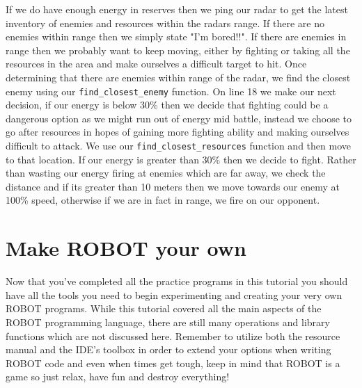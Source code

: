 \documentclass[a4paper]{article}
\begin{document}
If we do have enough energy in reserves then we ping our radar to get the latest inventory of enemies and resources within the radars range. If there are no enemies within range then we simply state "I'm bored!!". If there are enemies in range then we probably want to keep moving, either by fighting or taking all the resources in the area and make ourselves a difficult target to hit. Once determining that there are enemies within range of the radar, we find the closest enemy using our \texttt{find\_closest\_enemy} function. On line 18 we make our next decision, if our energy is below 30\% then we decide that fighting could be a dangerous option as we might run out of energy mid battle, instead we choose to go after resources in hopes of gaining more fighting ability and making ourselves difficult to attack. We use our \texttt{find\_closest\_resources} function and then move to that location. If our energy is greater than 30\% then we decide to fight. Rather than wasting our energy firing at enemies which are far away, we check the distance and if its greater than 10 meters then we move towards our enemy at 100\% speed, otherwise if we are in fact in range, we fire on our opponent.\\
 
\section*{Make ROBOT your own}

Now that you've completed all the practice programs in this tutorial you should have all the tools you need to begin experimenting and creating your very own ROBOT programs. While this tutorial covered all the main aspects of the ROBOT programming language, there are still many operations and library functions which are not discussed here. Remember to utilize both the resource manual and the IDE's toolbox in order to extend your options when writing ROBOT code and even when times get tough, keep in mind that ROBOT is a game so just relax, have fun and destroy everything!
\end{document}

